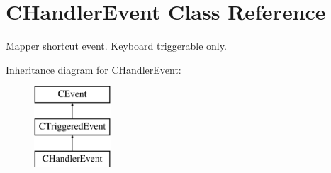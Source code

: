 \hypertarget{classCHandlerEvent}{\section{C\-Handler\-Event Class Reference}
\label{classCHandlerEvent}
}


Mapper shortcut event. Keyboard triggerable only.  


Inheritance diagram for C\-Handler\-Event\-:\begin{figure}[H]
\begin{center}
\leavevmode
\includegraphics[height=3.000000cm]{classCHandlerEvent}
\end{center}
\end{figure}

